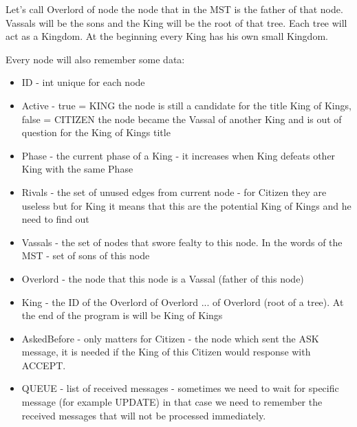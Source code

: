 \documentclass{article}
\begin{document}
Let's call Overlord of node the node that in the MST is the father of that node. Vassals will be the sons and the King will be the root of that tree. Each tree will act as a Kingdom. At the beginning every King has his own small Kingdom.

Every node will also remember some data:
\begin{itemize}
    \item ID - int unique for each node
    \item Active - true = KING the node is still a candidate for the title King of Kings, false = CITIZEN the node became the Vassal of another King and is out of question for the King of Kings title
    \item Phase - the current phase of a King - it increases when King defeats other King with the same Phase
    \item Rivals - the set of unused edges from current node - for Citizen they are useless but for King it means that this are the potential King of Kings and he need to find out
    \item Vassals - the set of nodes that swore fealty to this node. In the words of the MST - set of sons of this node
    \item Overlord - the node that this node is a Vassal (father of this node)
    \item King - the ID of the Overlord of Overlord ... of Overlord (root of a tree). At the end of the program is will be King of Kings
    \item AskedBefore - only matters for Citizen - the node which sent the ASK message, it is needed if the King of this Citizen would response with ACCEPT.
    \item QUEUE - list of received messages - sometimes we need to wait for specific message (for example UPDATE) in that case we need to remember the received messages that will not be processed immediately.
\end{itemize}
\end{document}
